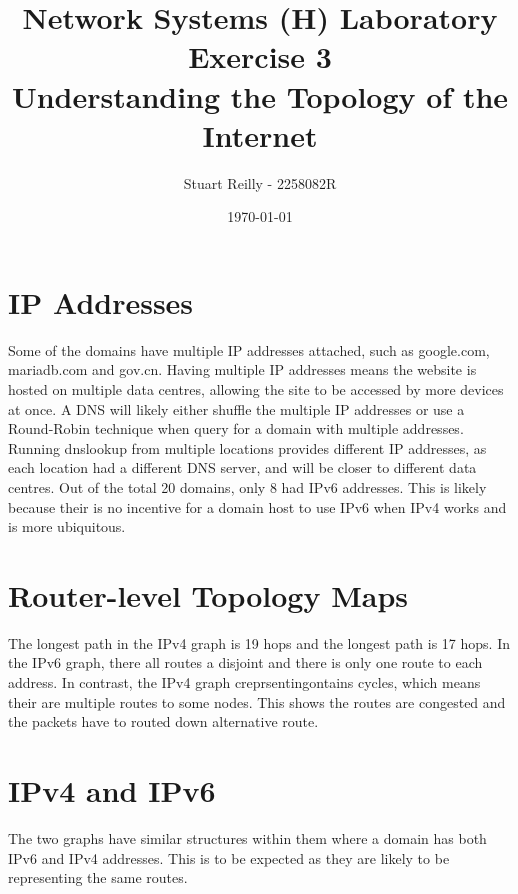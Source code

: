\documentclass[10pt,a4paper]{article}
\begin{document}
    \title{Network Systems (H) Laboratory Exercise 3\\Understanding the Topology of the Internet}
    \author{Stuart Reilly - 2258082R}
    \date{\today}
    \maketitle

    \section{IP Addresses}\label{sec:ip-addresses}
    Some of the domains have multiple IP addresses attached, such as google.com, mariadb.com and gov.cn.
    Having multiple IP addresses means the website is hosted on multiple data centres, allowing the site to be accessed
    by more devices at once.
    A DNS will likely either shuffle the multiple IP addresses or use a Round-Robin technique when query for a domain
    with multiple addresses.
    Running dnslookup from multiple locations provides different IP addresses, as each location had a different DNS
    server, and will be closer to different data centres.
    Out of the total 20 domains, only 8 had IPv6 addresses.
    This is likely because their is no incentive for a domain host to use IPv6 when IPv4 works and is more ubiquitous.

    \section{Router-level Topology Maps}\label{sec:router-level-topology-maps}
    The longest path in the IPv4 graph is 19 hops and the longest path is 17 hops.
    In the IPv6 graph, there all routes a disjoint and there is only one route to each address.
    In contrast, the IPv4 graph creprsentingontains cycles, which means their are multiple routes to some nodes.
    This shows the routes are congested and the packets have to routed down alternative route.

    \section{IPv4 and IPv6}\label{sec:ipv4-and-ipv6}
    The two graphs have similar structures within them where a domain has both IPv6 and IPv4 addresses.
    This is to be expected as they are likely to be representing the same routes.
\end{document}

